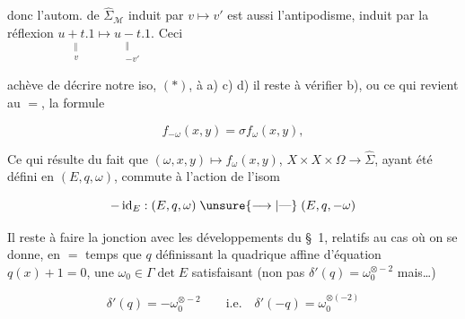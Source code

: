 
donc l'autom. de $\hat\Sigma_{\mathcal M}$ induit par $v\mapsto v'$ est aussi l'antipodisme, induit par la réflexion $\underset{\substack{\Vert\\v}}{u+t.1}\longmapsto\underset{\substack{\Vert\\-v'}}{u-t.1}$. Ceci


achève de décrire notre iso, $(*)$,  à a) c) d) il reste à vérifier b), ou ce qui revient au $=$, la formule

\[
f_{-\omega}(x,y)=\sigma f_\omega(x,y),
\]

Ce qui résulte du fait que $(\omega,x,y)\mapsto f_\omega(x,y)$, $X\times X\times\Omega\longrightarrow\hat\Sigma$, ayant été défini  en $(E,q,\omega)$, commute à l'action de l'isom

\[
-\operatorname{id}_E:(E,q,\omega)\mathrel{\unsure{\longrightarrow|\text{---}}}(E,q,-\omega)
\]


Il reste à faire la jonction avec les développements du \S~1, relatifs au cas où on se donne, en $=$ temps que $q$  définissant la quadrique affine d'équation $q(x)+1=0$, une $\omega_0\in\Gamma\det E$ satisfaisant (non pas $\delta'(q)=\omega_0^{\otimes-2}$ mais\ldots)

\[
\delta'(q)=-\omega_0^{\otimes-2}\qquad\text{i.e.}\quad\delta'(-q)=\omega_0^{\otimes(-2)}
\]

